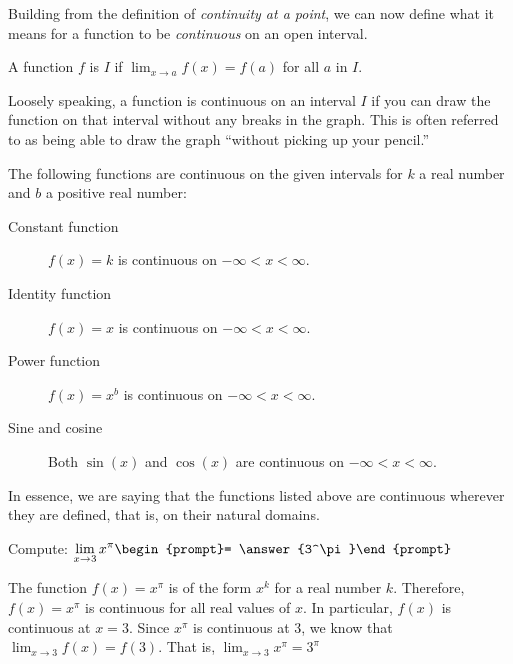 \documentclass{ximera}
\begin{document}
Building from the definition of \textit{continuity at a point}, we can
now define what it means for a function to be \textit{continuous} on
an open interval.

\begin{definition}
  A function $f$ is  $I$ if
  $\displaystyle\lim_{x\to a} f(x) = f(a)$ for all $a$ in $I$.
\end{definition}

Loosely speaking, a function is continuous on an interval $I$ if you
can draw the function on that interval without any breaks in the
graph.  This is often referred to as being able to draw the graph
``without picking up your pencil.''

\begin{theorem}\label{theorem:continuity}
The following functions are continuous on the given intervals for $k$ a real number and $b$ a positive real number:
\begin{description}
\item[Constant function] $f(x) =k$ is continuous on $-\infty < x < \infty$.
\item[Identity function] $f(x) = x$ is continuous on $-\infty < x < \infty$.
\item[Power function] $f(x)=x^b$ is continuous on $-\infty < x < \infty$.
\item[Sine and cosine] Both $\sin(x)$ and $\cos(x)$ are continuous on $-\infty < x < \infty$.
\end{description}
In essence, we are saying that the functions listed above are
continuous wherever they are defined, that is, on their natural
domains.
\end{theorem}


\begin{question}
  Compute:
  $\displaystyle\lim_{x\to 3} x^\pi \begin{prompt}= \answer{3^\pi}\end{prompt}$
  \begin{feedback}
    The function $f(x)=x^\pi$ is of the form $x^k$ for a real number
    $k$.  Therefore, $f(x)=x^\pi$ is continuous for all real values of
    $x$.  In particular, $f(x)$ is continuous at $x=3$.  Since $x^\pi$
    is continuous at $3$, we know that $\displaystyle\lim_{x\to 3} f(x) = f(3)$.
    That is, $\displaystyle\lim_{x\to 3} x^\pi = 3^\pi$
  \end{feedback}  
\end{question}
\end{document}
